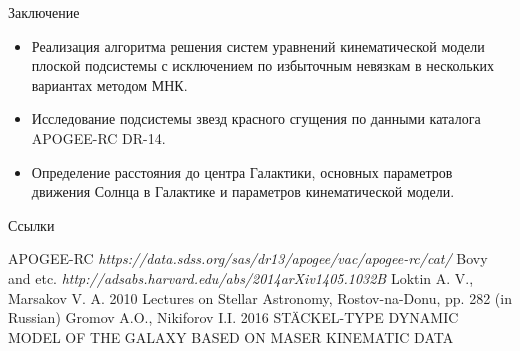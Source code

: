 \documentclass{beamer}
\begin{document}
\begin{frame}{Заключение}
	\begin{itemize}
		\item Реализация алгоритма решения систем уравнений кинематической модели плоской подсистемы с исключением по избыточным невязкам в нескольких вариантах методом МНК.
		\item Исследование подсистемы звезд красного сгущения по данными каталога APOGEE-RC DR-14.
		\item Определение расстояния до центра Галактики, основных параметров движения Солнца в Галактике и параметров кинематической модели.
	\end{itemize}
\end{frame}


\begin{frame}{Ссылки}
 \begin{thebibliography}{10}
\beamertemplatebookbibitems
{} {\sc APOGEE-RC} {\em https://data.sdss.org/sas/dr13/apogee/vac/apogee-rc/cat/}
 {\sc Bovy and etc.} {\em http://adsabs.harvard.edu/abs/2014arXiv1405.1032B}
 {\sc Loktin A. V., Marsakov V. A. 2010} {Lectures on Stellar Astronomy, Rostov-na-Donu, pp. 282 (in Russian)}
 {\sc Gromov A.O., Nikiforov I.I. 2016} {STÄCKEL-TYPE DYNAMIC MODEL OF THE GALAXY BASED
ON MASER KINEMATIC DATA}

\end{thebibliography}
\end{frame}
\end{document}
